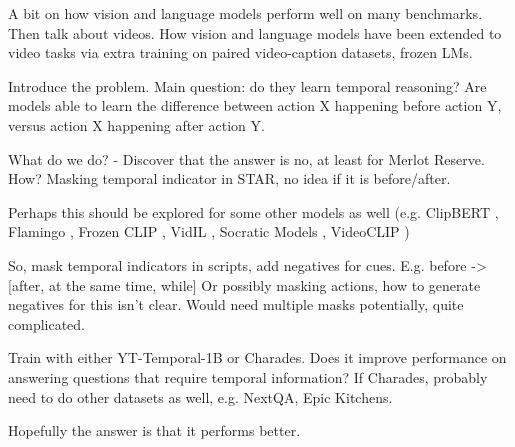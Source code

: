 
A bit on how vision and language models perform well on many benchmarks. Then
talk about videos. How vision and language models have been extended to video
tasks via extra training on paired video-caption datasets, frozen LMs.

Introduce the problem. Main question: do they learn temporal reasoning? Are
models able to learn the difference between action X happening before action Y,
versus action X happening after action Y.

What do we do? - Discover that the answer is no, at least for Merlot Reserve.
How? Masking temporal indicator in STAR, no idea if it is before/after.

Perhaps this should be explored for some other models as well (e.g. ClipBERT
\cite{lei2021clipbert}, Flamingo \cite{alayrac2022flamingo}, Frozen CLIP
\cite{lin2022evl}, VidIL \cite{wang2022vidil}, Socratic Models
\cite{zeng2023socratic}, VideoCLIP \cite{xu2021videoclip})

So, mask temporal indicators in scripts, add negatives for cues.
E.g. before -\textgreater [after, at the same time, while]
Or possibly masking actions, how to generate negatives for this isn't clear.
Would need multiple masks potentially, quite complicated.

Train with either YT-Temporal-1B or Charades. Does it improve performance on
answering questions that require temporal information? If Charades, probably
need to do other datasets as well, e.g. NextQA, Epic Kitchens.

Hopefully the answer is that it performs better.
